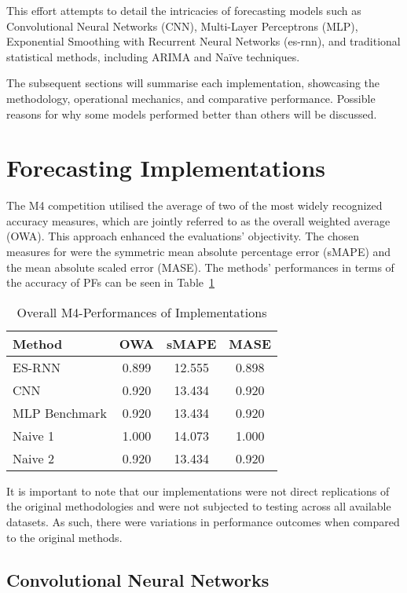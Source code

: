\documentclass[conference]{IEEEtran}
\begin{document}
This effort attempts to detail the intricacies of forecasting models such as Convolutional Neural Networks (CNN), Multi-Layer Perceptrons (MLP), Exponential Smoothing with Recurrent Neural Networks (es-rnn), and traditional statistical methods, including ARIMA and Naïve techniques.

The subsequent sections will summarise each implementation, showcasing the methodology, operational mechanics, and comparative performance. Possible reasons for why some models performed better than others will be discussed.

\section{Forecasting Implementations}

The M4 competition\cite{m4} utilised the average of two of the most widely recognized accuracy measures, which are jointly referred to as the overall weighted average (OWA). This approach enhanced the evaluations' objectivity. The chosen measures for were the symmetric mean absolute percentage error (sMAPE) and the mean absolute scaled error (MASE). The methods' performances in terms of the accuracy of PFs can be seen in Table~\ref{tab:metrics}

\begin{table}[h]
\centering
\caption{Overall M4-Performances of Implementations\cite{m4}}\label{tab:metrics}
\begin{tabular}{lccc}
\toprule
Method & OWA & sMAPE & MASE \\
\midrule
ES-RNN & 0.899 & 12.555 & 0.898 \\
CNN & 0.920 & 13.434 & 0.920 \\
MLP Benchmark & 0.920 & 13.434 & 0.920 \\
Naive 1 & 1.000 & 14.073 & 1.000 \\
Naive 2 & 0.920 & 13.434 & 0.920 \\
\bottomrule
\end{tabular}
\end{table}

It is important to note that our implementations were not direct replications of the original methodologies and were not subjected to testing across all available datasets. As such, there were variations in performance outcomes when compared to the original methods.

\subsection{Convolutional Neural Networks}
\end{document}
